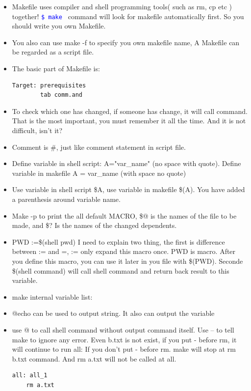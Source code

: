 \documentclass[a4paper,11pt,twoside]{book}
\newcommand{\linuxcommand}[1]{\texttt{\textcolor{blue}{\$ #1 \Pisymbol{psy}{191}}}}
\begin{document}
	\begin{itemize}
		\item Makefile uses compiler and shell programming tools( such as rm, cp etc ) together! \linuxcommand{make} command will look for makefile automatically first. So you should write you own Makefile.

		\item You also can use make -f to specify you own makefile name, A Makefile can be regarded as a script file.


		\item The basic part of Makefile is:
\begin{verbatim}
Target: prerequisites
		tab comm.and 
\end{verbatim}
				
										

		\item To check which one has changed, if someone has change, it will call command. That is the most important, you must remember it all the time.  And it is not difficult, isn't it?

		\item Comment is \#, just like comment statement in script file.
		
		\item Define variable in shell script: A="var\_name" (no space with quote). Define variable in makefile A = var\_name (with space no quote)

		\item Use variable in shell script \$A, use variable in makefile \$(A). You have added a parenthesis around variable name.  
		
		\item Make -p to print the all default MACRO, \$@ is the names of the file to be made, and \$? Is the names of the changed dependents.

		\item PWD :=\$(shell pwd) I need to explain two thing, the first is difference between := and =, := only expand this macro once.    PWD is macro. After you define this macro, you can use it later in you file with \$(PWD). Seconde \$(shell command) will call shell command and return back result to this variable. 

\item make internal variable list:

		\item @echo can be used to output string. It also can output the variable

		\item use @ to call shell command without output command itself. Use – to tell make to ignore any error. Even b.txt is not exist, if you put - before rm, it will continue to run all: If you don't put - before rm. make will stop at rm b.txt command. And rm a.txt will not be called at all.  
\begin{verbatim}
all: all_1
	rm a.txt
	 

\end{verbatim}
\end{itemize}
\end{document}
